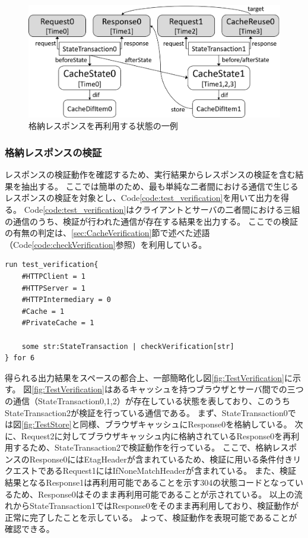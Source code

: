 \documentclass[journal]{IEEEtran}
\begin{document}
\begin{figure}[htb]
\centering
\includegraphics[width=\hsize]{./fig/TestReuse.eps}
\caption{格納レスポンスを再利用する状態の一例}
\label{fig:TestReuse}
\end{figure}

\subsubsection{格納レスポンスの検証}
レスポンスの検証動作を確認するため、実行結果からレスポンスの検証を含む結果を抽出する。
ここでは簡単のため、最も単純な二者間における通信で生じるレスポンスの検証を対象とし、Code\ref{code:test_verification}を用いて出力を得る。
Code\ref{code:test_verification}はクライアントとサーバの二者間における三組の通信のうち、検証が行われた通信が存在する結果を出力する。
ここでの検証の有無の判定は、\ref{sec:CacheVerification}節で述べた述語（Code\ref{code:checkVerification}参照）を利用している。

\begin{lstlisting}[caption=格納レスポンスの検証, label=code:test_verification]
run test_verification{
	#HTTPClient = 1
	#HTTPServer = 1
	#HTTPIntermediary = 0
	#Cache = 1
	#PrivateCache = 1

	some str:StateTransaction | checkVerification[str]
} for 6
\end{lstlisting}

得られる出力結果をスペースの都合上、一部簡略化し図\ref{fig:TestVerification}に示す。
図\ref{fig:TestVerification}はあるキャッシュを持つブラウザとサーバ間での三つの通信（StateTransaction0,1,2）が存在している状態を表しており、このうちStateTransaction2が検証を行っている通信である。
まず、StateTransaction0では図\ref{fig:TestStore}と同様、ブラウザキャッシュにResponse0を格納している。
次に、Request2に対してブラウザキャッシュ内に格納されているResponse0を再利用するため、StateTransaction2で検証動作を行っている。
ここで、格納レスポンスのResponse0にはEtagHeaderが含まれているため、検証に用いる条件付きリクエストであるRequest1にはIfNoneMatchHeaderが含まれている。
また、検証結果となるResponse1は再利用可能であることを示す304の状態コードとなっているため、Response0はそのまま再利用可能であることが示されている。
以上の流れからStateTransaction1ではResponse0をそのまま再利用しており、検証動作が正常に完了したことを示している。
よって、検証動作を表現可能であることが確認できる。
\end{document}
